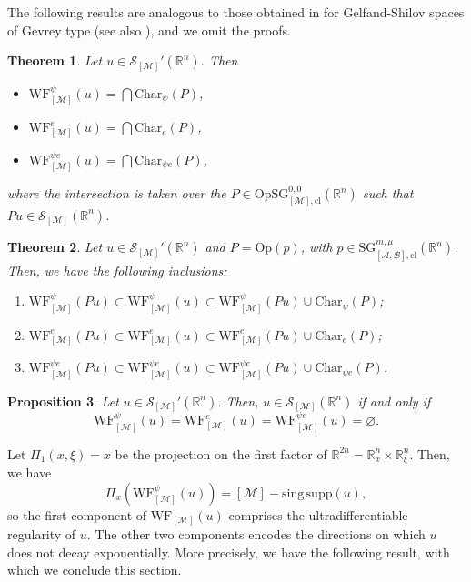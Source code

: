 \documentclass[11pt,reqno]{amsart}
\numberwithin{equation}{section}
\newtheorem{theorem}{Theorem}[section]
\newtheorem{proposition}[theorem]{Proposition}
\newcommand{\R}{{\mathbb{R}}} %
\newcommand{\caS}{{\mathcal{S}}}
\newcommand{\Op}{{\mathrm{Op}}}
\newcommand{\SG}{{\mathrm{SG}}}
\newcommand{\M}{{\mathcal{M}}} %
\newcommand{\A}{{\mathcal{A}}} %
\newcommand{\B}{{\mathcal{B}}} %
\newcommand{\cl}{{\mathrm{cl}}}
\begin{document}
The following results are analogous to those obtained in \cite{CapRod2006} for Gelfand-Shilov spaces of Gevrey type (see also \cite{Capp2006}), and we omit the proofs.

\begin{theorem}
	Let $u\in\caS_{[\M]}'(\R^n)$. Then
	\begin{itemize}
		\item $\mathrm{WF}_{[\M]}^{\psi}(u) = \bigcap\mathrm{Char}_\psi(P)$,
		
		\item $\mathrm{WF}_{[\M]}^{e}(u) = \bigcap\mathrm{Char}_e(P)$,
		
		\item $\mathrm{WF}_{[\M]}^{\psi e}(u) = \bigcap\mathrm{Char}_{\psi e}(P)$,
	\end{itemize}
	where the intersection is taken over the $P\in\Op\SG_{[\M],\cl}^{0,0}(\R^n)$ such that $Pu\in\caS_{[\M]}(\R^n)$.
\end{theorem}


\begin{theorem}
	Let $u\in\caS_{[\M]}'(\R^n)$ and $P=\Op(p)$, with $p\in\SG_{[\A,\B],\mathrm{cl}}^{m,\mu}(\R^n)$. Then, we have the following inclusions:
	\begin{enumerate}
		\item $\mathrm{WF}_{[\M]}^{\psi}(Pu) \subset \mathrm{WF}_{[\M]}^{\psi}(u) \subset \mathrm{WF}_{[\M]}^{\psi}(Pu)\cup \mathrm{Char}_\psi(P)$;
		
		\item $\mathrm{WF}_{[\M]}^{e}(Pu) \subset \mathrm{WF}_{[\M]}^{e}(u) \subset \mathrm{WF}_{[\M]}^{e}(Pu)\cup \mathrm{Char}_e(P)$;
		
		\item $\mathrm{WF}_{[\M]}^{\psi e}(Pu) \subset \mathrm{WF}_{[\M]}^{\psi e}(u) \subset \mathrm{WF}_{[\M]}^{\psi e}(Pu)\cup \mathrm{Char}_{\psi e}(P)$.
	\end{enumerate}
\end{theorem}


\begin{proposition}
	Let $u\in\caS_{[\M]}'(\R^n)$. Then, $u\in\caS_{[\M]}(\R^n)$ if and only if
	\[\mathrm{WF}_{[\M]}^{\psi}(u) = \mathrm{WF}_{[\M]}^{e}(u) = \mathrm{WF}_{[\M]}^{\psi e}(u) = \varnothing.\]
\end{proposition}


Let $\Pi_1(x,\xi)=x$ be the projection on the first factor of $\R^{2n}=\R^n_x\times\R^n_\xi$. Then, we have
%
\[\Pi_x\left(\mathrm{WF}_{[\M]}^{\psi}(u)\right) = [\M]-\mathrm{sing\,supp}(u),\]
%
so the first component of $\mathrm{WF}_{[\M]}(u)$ comprises the ultradifferentiable regularity of $u$. The other two components encodes the directions 
on which $u$ does not decay exponentially. More precisely, we have the following result, with which we conclude this section.
\end{document}
